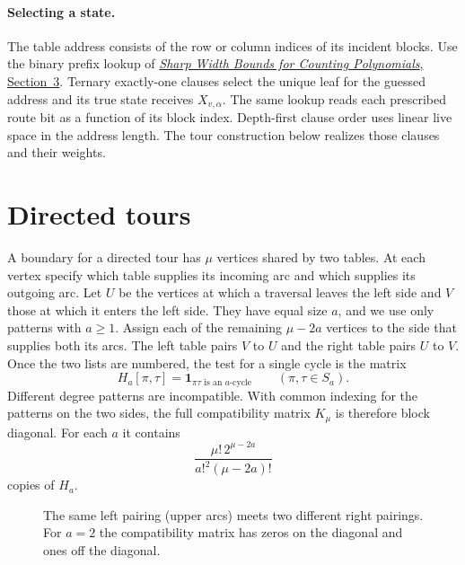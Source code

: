 \documentclass[11pt]{article}
\theoremstyle{definition}
\newcommand{\one}{\mathbf{1}}
\begin{document}
\paragraph{Selecting a state.}
The table address consists of the row or column indices of its incident blocks. Use the binary prefix lookup of \href{sharp-pathwidth-bases.pdf}{\emph{Sharp Width Bounds for Counting Polynomials}, Section~3}. Ternary exactly-one clauses select the unique leaf for the guessed address and its true state receives \(X_{v,\alpha}\). The same lookup reads each prescribed route bit as a function of its block index. Depth-first clause order uses linear live space in the address length. The tour construction below realizes those clauses and their weights.

\section{Directed tours}\label{sec:tours}

A boundary for a directed tour has \(\mu\) vertices shared by two tables. At each vertex specify which table supplies its incoming arc and which supplies its outgoing arc. Let \(U\) be the vertices at which a traversal leaves the left side and \(V\) those at which it enters the left side. They have equal size \(a\), and we use only patterns with \(a\ge1\). Assign each of the remaining \(\mu-2a\) vertices to the side that supplies both its arcs. The left table pairs \(V\) to \(U\) and the right table pairs \(U\) to \(V\). Once the two lists are numbered, the test for a single cycle is the matrix
\[
 H_a[\pi,\tau]=\one_{\pi\tau\text{ is an }a\text{-cycle}}\qquad(\pi,\tau\in S_a).
\]
Different degree patterns are incompatible. With common indexing for the patterns on the two sides, the full compatibility matrix \(K_\mu\) is therefore block diagonal. For each \(a\) it contains
\begin{equation}\label{eq:patterncount}
            \frac{\mu!\,2^{\mu-2a}}{a!^2(\mu-2a)!}
\end{equation}
copies of \(H_a\).

\begin{figure}[ht]
\centering
{}
\caption{The same left pairing (upper arcs) meets two different right pairings. For \(a=2\) the compatibility matrix has zeros on the diagonal and ones off the diagonal.}\label{fig:pairing}
\end{figure}
\end{document}
